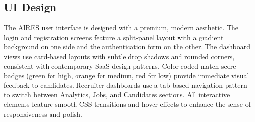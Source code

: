  \subsection{UI Design}
The AIRES user interface is designed with a premium, modern aesthetic. The login and registration screens feature a split-panel layout with a gradient background on one side and the authentication form on the other. The dashboard views use card-based layouts with subtle drop shadows and rounded corners, consistent with contemporary SaaS design patterns. Color-coded match score badges (green for high, orange for medium, red for low) provide immediate visual feedback to candidates. Recruiter dashboards use a tab-based navigation pattern to switch between Analytics, Jobs, and Candidates sections. All interactive elements feature smooth CSS transitions and hover effects to enhance the sense of responsiveness and polish.

